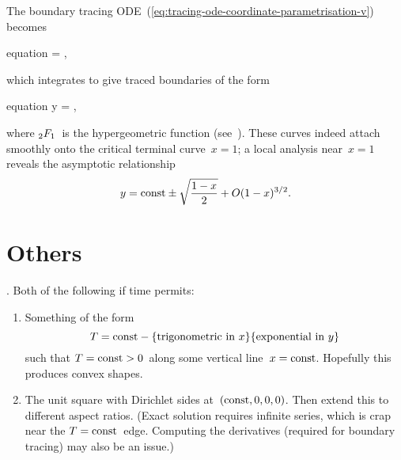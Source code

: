 The boundary tracing ODE~(\ref{eq:tracing-ode-coordinate-parametrisation-v})
becomes
\begin{important}{equation}
   = \mp {},
  \label{eq:slab-tracing-ode-coordinate-parametrisation-y}
\end{important}
which integrates to give traced boundaries of the form
\begin{important}{equation}
  y =
  \const
    \mp
    \cdot
  \hypergeo {},
  \label{eq:slab-traced-boundary}
\end{important}
where ${_2F_1}$~is the hypergeometric function
(see~\tbd).
These curves indeed attach smoothly
onto the critical terminal curve~$x = 1$;
a local analysis near~$x = 1$ reveals the asymptotic relationship
\begin{equation}
  y = \mathrm{const} \pm \sqrt{\frac{1 - x}{2}} + \mathop{}\! O (1 - x)^{3/2}.
  \label{eq:slab-traced-boundary-x-near-1}
\end{equation}

\section{Others}

\tbd. Both of the following if time permits:
\begin{enumerate}
  \item
    Something of the form
    \[
      T = \const - \textq{trigonometric in~$x$} \textq{exponential in~$y$}
    \]
    such that $T = \mathrm{const} > 0$~along some vertical line~$x = \mathrm{const}$.
    Hopefully this produces convex shapes.
  \item
    The unit square with Dirichlet sides at~$(\mathrm{const}, 0, 0, 0)$.
    Then extend this to different aspect ratios.
    (Exact solution requires infinite series,
    which is crap near the $T = \mathrm{const}$~edge.
    Computing the derivatives (required for boundary tracing)
    may also be an issue.)
\end{enumerate}
